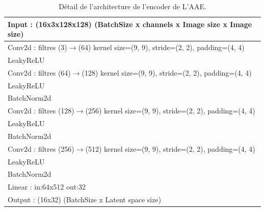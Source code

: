 \documentclass[11pt,francais]{article}
\begin{document}
\begin{appendix}
\begin{table}[h]
  \begin{tabular}{l}
  \hline
  Input : (16x3x128x128) (BatchSize x channels x Image size x Image size) \tabularnewline
  \hline
  \hline
  Conv2d : filtres (3)\(\rightarrow\)(64) kernel size=(9, 9), stride=(2, 2), padding=(4, 4) \tabularnewline
  LeakyReLU\tabularnewline
  \hline
  Conv2d : filtres (64)\(\rightarrow\)(128) kernel size=(9, 9), stride=(2, 2), padding=(4, 4) \tabularnewline
  LeakyReLU\tabularnewline
  BatchNorm2d\tabularnewline
  \hline
  Conv2d : filtres (128)\(\rightarrow\)(256) kernel size=(9, 9), stride=(2, 2), padding=(4, 4) \tabularnewline
  LeakyReLU\tabularnewline
  BatchNorm2d\tabularnewline
  \hline
  Conv2d : filtres (256)\(\rightarrow\)(512) kernel size=(9, 9), stride=(2, 2), padding=(4, 4) \tabularnewline
  LeakyReLU\tabularnewline
  BatchNorm2d\tabularnewline
  \hline
  Linear : in:64x512 out:32\tabularnewline
  \hline
  \hline
  Output : (16x32) (BatchSize x Latent space size) \tabularnewline
  \hline
  \end{tabular}
  \label{tab:tab6}
  \caption{Détail de l'architecture de l'encoder de L'AAE.}
\end{table}


\end{appendix}

\end{document}
